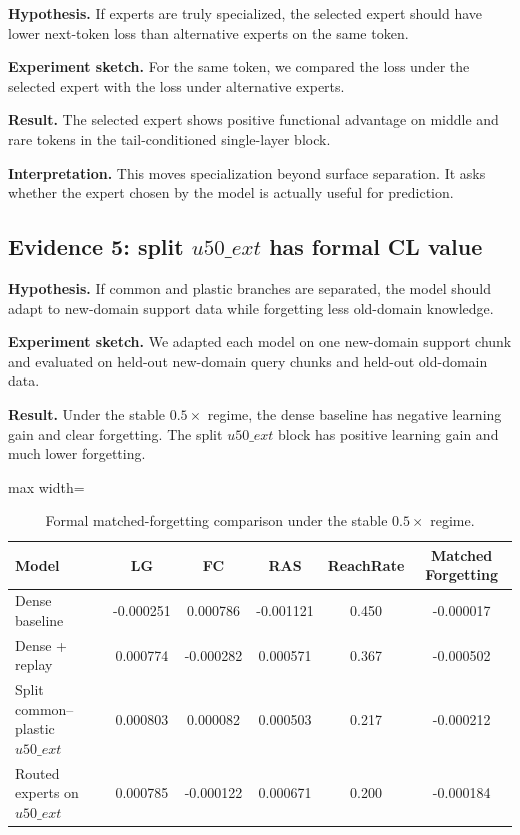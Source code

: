 \documentclass[11pt]{article}
\newcommand{\tablesize}{\footnotesize}
\begin{document}
\textbf{Hypothesis.} If experts are truly specialized, the selected expert should have lower next-token loss than alternative experts on the same token.

\textbf{Experiment sketch.} For the same token, we compared the loss under the selected expert with the loss under alternative experts.

\textbf{Result.} The selected expert shows positive functional advantage on middle and rare tokens in the tail-conditioned single-layer block.

\textbf{Interpretation.} This moves specialization beyond surface separation. It asks whether the expert chosen by the model is actually useful for prediction.

\subsection{Evidence 5: split $u50\_ext$ has formal CL value}

\textbf{Hypothesis.} If common and plastic branches are separated, the model should adapt to new-domain support data while forgetting less old-domain knowledge.

\textbf{Experiment sketch.} We adapted each model on one new-domain support chunk and evaluated on held-out new-domain query chunks and held-out old-domain data.

\textbf{Result.} Under the stable $0.5\times$ regime, the dense baseline has negative learning gain and clear forgetting. The split $u50\_ext$ block has positive learning gain and much lower forgetting.

\begin{table}[H]
\centering
\tablesize
\begin{adjustbox}{max width=\linewidth}
\begin{tabular}{lccccc}
\toprule
Model & LG & FC & RAS & ReachRate & Matched Forgetting \\
\midrule
Dense baseline & -0.000251 & 0.000786 & -0.001121 & 0.450 & -0.000017 \\
Dense + replay & 0.000774 & -0.000282 & 0.000571 & 0.367 & -0.000502 \\
Split common--plastic $u50\_ext$ & 0.000803 & 0.000082 & 0.000503 & 0.217 & -0.000212 \\
Routed experts on $u50\_ext$ & 0.000785 & -0.000122 & 0.000671 & 0.200 & -0.000184 \\
\bottomrule
\end{tabular}
\end{adjustbox}
\caption{Formal matched-forgetting comparison under the stable $0.5\times$ regime.}
\end{table}
\end{document}
